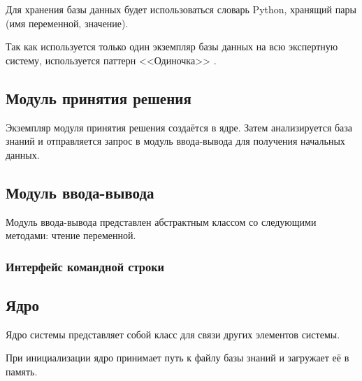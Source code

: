 Для хранения базы данных будет использоваться словарь Python, хранящий пары (имя переменной, значение).

Так как используется только один экземпляр базы данных на всю экспертную систему, используется паттерн <<Одиночка>> \cite{gammaDesignPatternsElements1995}.

\subsection{Модуль принятия решения}

Экземпляр модуля принятия решения создаётся в ядре.
Затем анализируется база знаний и отправляется запрос в модуль ввода-вывода для получения начальных данных.

\subsection{Модуль ввода-вывода}

Модуль ввода-вывода представлен абстрактным классом со следующими методами: чтение переменной.

\subsubsection{Интерфейс командной строки}

\subsection{Ядро}

Ядро системы представляет собой класс для связи других элементов системы.

При инициализации ядро принимает путь к файлу базы знаний и загружает её в память.
